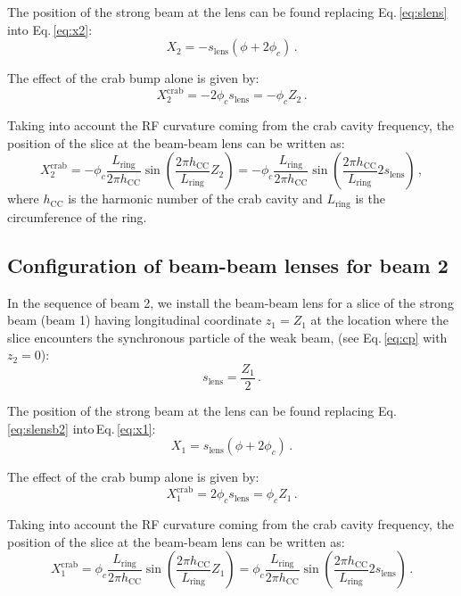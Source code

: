 The position of the strong beam at the lens can be found replacing Eq.\,\eqref{eq:slens} into Eq.\,\eqref{eq:x2}:
\begin{equation}
   X_2 = - s_\text{lens} (\phi + 2 \phi_c)
   \, .
\end{equation}

The effect of the crab bump alone is given by:
\begin{equation}
   X^\text{crab}_2 = - 2 \phi_c s_\text{lens} = -\phi_c Z_2 \, .
\end{equation}

Taking into account the RF curvature coming from the crab cavity frequency, the position of the slice at the beam-beam lens can be written as:
\begin{equation}
   X^\text{crab}_2 = -\phi_c \frac{L_\text{ring}}{2 \pi h_\text{CC}} \sin\left(  \frac{2 \pi h_\text{CC}}{L_\text{ring}} Z_2\right) = -\phi_c \frac{L_\text{ring}}{2 \pi h_\text{CC}} \sin\left(  \frac{2 \pi h_\text{CC}}{L_\text{ring}} 2 s_\text{lens}\right)
   \, ,
   \label{eq:x2crab}
\end{equation}
where $h_\text{CC}$ is the harmonic number of the crab cavity and $L_\text{ring}$ is the circumference of the ring.

\subsection{Configuration of beam-beam lenses for beam 2}
In the sequence of beam 2, we install the beam-beam lens for a slice of the strong beam (beam 1) having longitudinal coordinate $z_1=Z_1$ at the location where the slice encounters the synchronous particle of the weak beam, (see Eq.\,\eqref{eq:cp} with $z_2 = 0$):
\begin{equation}
    s_\text{lens} = \frac{Z_1}{2}
    \, .
    \label{eq:slensb2}
\end{equation}

The position of the strong beam at the lens can be found replacing Eq.\,\eqref{eq:slensb2} into\,Eq.\,\eqref{eq:x1}:
\begin{equation}
   X_1 = s_\text{lens} (\phi + 2 \phi_c)
   \, .
\end{equation}

The effect of the crab bump alone is given by:
\begin{equation}
   X^\text{crab}_1 = 2 \phi_c s_\text{lens} = \phi_c Z_1
   \, .
\end{equation}

Taking into account the RF curvature coming from the crab cavity frequency, the position of the slice at the beam-beam lens can be written as:
\begin{equation}
   X^\text{crab}_1 = \phi_c \frac{L_\text{ring}}{2 \pi h_\text{CC}} \sin\left(  \frac{2 \pi h_\text{CC}}{L_\text{ring}} Z_1\right) = \phi_c \frac{L_\text{ring}}{2 \pi h_\text{CC}} \sin\left(  \frac{2 \pi h_\text{CC}}{L_\text{ring}} 2 s_\text{lens}\right)
   \, .
   \label{eq:x1crab}
\end{equation}

